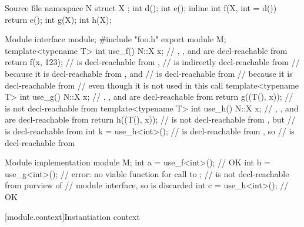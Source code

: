 \pnum
\begin{example}
\begin{codeblocktu}{Source file }
namespace N {
  struct X {};
  int d();
  int e();
  inline int f(X, int = d()) { return e(); }
  int g(X);
  int h(X);
}
\end{codeblocktu}

\begin{codeblocktu}{Module  interface}
module;
#include "foo.h"
export module M;
template<typename T> int use_f() {
  N::X x;                       // , , and \tcode{::} are decl-reachable from 
  return f(x, 123);             //  is decl-reachable from ,
                                //  is indirectly decl-reachable from 
                                //   because it is decl-reachable from , and
                                //  is decl-reachable from 
                                //   because it is decl-reachable from 
                                //   even though it is not used in this call
}
template<typename T> int use_g() {
  N::X x;                       // , , and \tcode{::} are decl-reachable from 
  return g((T(), x));           //  is not decl-reachable from 
}
template<typename T> int use_h() {
  N::X x;                       // , , and \tcode{::} are decl-reachable from 
  return h((T(), x));           //  is not decl-reachable from , but
                                //  is decl-reachable from 
}
int k = use_h<int>();
  //  is decl-reachable from , so
  //  is decl-reachable from 
\end{codeblocktu}

\begin{codeblocktu}{Module  implementation}
module M;
int a = use_f<int>();           // OK
int b = use_g<int>();           // error: no viable function for call to ;
                                //  is not decl-reachable from purview of
                                // module  interface, so is discarded
int c = use_h<int>();           // OK
\end{codeblocktu}
\end{example}

[module.context]{Instantiation context}

